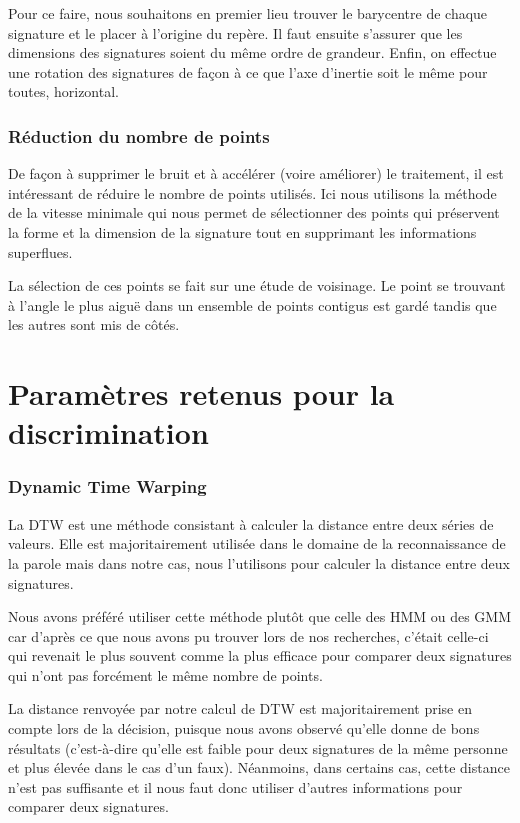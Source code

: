 \documentclass[fontsize=10pt, twoside=no]{scrartcl} %
\begin{document}
Pour ce faire, nous souhaitons en premier lieu trouver le barycentre de chaque signature et le placer à l'origine du repère. Il faut ensuite s'assurer que les dimensions des signatures soient du même ordre de grandeur. Enfin, on effectue une rotation des signatures de façon à ce que l'axe d'inertie soit le même pour toutes, horizontal.

\section{Réduction du nombre de points}

De façon à supprimer le bruit et à accélérer (voire améliorer) le traitement, il est intéressant de réduire le nombre de points utilisés. Ici nous utilisons la méthode de la vitesse minimale qui nous permet de sélectionner des points qui préservent la forme et la dimension de la signature tout en supprimant les informations superflues.

La sélection de ces points se fait sur une étude de voisinage. Le point se trouvant à l'angle le plus aiguë dans un ensemble de points contigus est gardé tandis que les autres sont mis de côtés.

\part{Paramètres retenus pour la discrimination}

\section{Dynamic Time Warping}

La DTW est une méthode consistant à calculer la distance entre deux séries de valeurs. Elle est majoritairement utilisée dans le domaine de la reconnaissance de la parole mais dans notre cas, nous l'utilisons pour calculer la distance entre deux signatures.

Nous avons préféré utiliser cette méthode plutôt que celle des HMM ou des GMM car d'après ce que nous avons pu trouver lors de nos recherches, c'était celle-ci qui revenait le plus souvent comme la plus efficace pour comparer deux signatures qui n'ont pas forcément le même nombre de points.

La distance renvoyée par notre calcul de DTW est majoritairement prise en compte lors de la décision, puisque nous avons observé qu'elle donne de bons résultats (c'est-à-dire qu'elle est faible pour deux signatures de la même personne et plus élevée dans le cas d'un faux). Néanmoins, dans certains cas, cette distance n'est pas suffisante et il nous faut donc utiliser d'autres informations pour comparer deux signatures.
\end{document}
